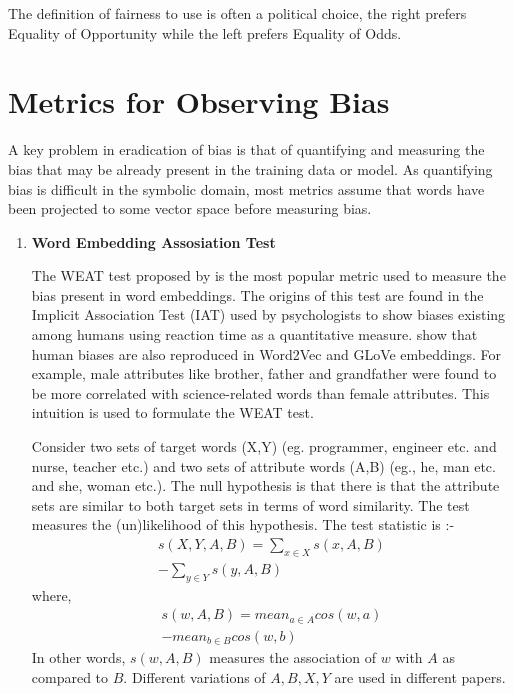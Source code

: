 \documentclass[11pt,a4paper]{article}
\begin{document}
The definition of fairness to use is often a political choice, the right prefers Equality of Opportunity while the left prefers Equality of Odds.
\section{Metrics for Observing Bias}
\label{sec:metrics}
A key problem in eradication of bias is that of quantifying and measuring the bias that may be already present in the training data or model. As quantifying bias is difficult in the symbolic domain, most metrics assume that words have been projected to some vector space before measuring bias.

\begin{enumerate}
    \item \textbf{Word Embedding Assosiation Test}
    
    The WEAT test proposed by \citet{Caliskan183} is the most popular metric used to measure the bias present in word embeddings. The origins of this test are found in the Implicit Association Test (IAT) used by psychologists to show biases existing among humans using reaction time as a quantitative measure. \citet{Caliskan183} show that human biases are also reproduced in Word2Vec and GLoVe embeddings. For example, male attributes like brother, father and grandfather were found to be more correlated with science-related words than female attributes. This intuition is used to formulate the WEAT test.

    Consider two sets of target words (X,Y) (eg. programmer, engineer etc. and nurse, teacher etc.) and two sets of attribute words (A,B) (eg., he, man etc. and she, woman etc.). The null hypothesis is that there is that the attribute sets are similar to both target sets in terms of word similarity. The test measures the (un)likelihood of this hypothesis. The test statistic is :- 
    \begin{multline}
    s(X,Y,A,B) = \sum_{x \in X} s(x,A,B)\\ - \sum_{y \in Y} s(y,A,B)
    \end{multline}
    where,
    \begin{multline}
        s(w,A,B) = mean_{a \in A}cos(w,a)\\ - mean_{b \in B}cos(w,b)
    \end{multline}
    In other words, $s(w, A, B)$ measures the association of $w$ with $A$ as compared to $B$. Different variations of $A, B, X, Y$ are used in different papers.
    

\end{enumerate}
\end{document}
